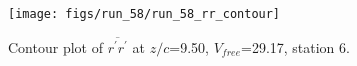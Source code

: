 \begin{figure}[H]
\centering
\texttt{[image: figs/run\_58/run\_58\_rr\_contour]}
\caption{Contour plot of $\overline{r^\prime r^\prime}$ at $z/c$=9.50, $V_{free}$=29.17, station 6.}
\label{fig:run_58_rr_contour}
\end{figure}


